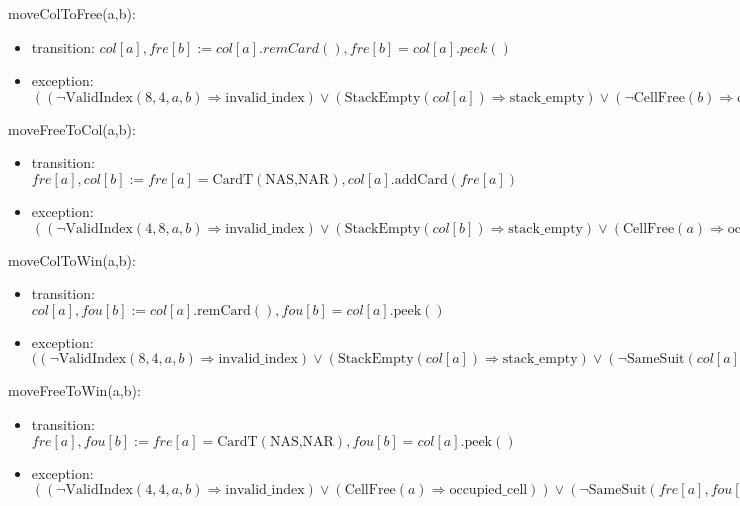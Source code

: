 \documentclass[12pt]{article}
\newcommand{\means}{\Rightarrow}
\newcommand{\m}[1]{\mbox{#1}}
\begin{document}
\noindent moveColToFree(a,b):
\begin{itemize}
    \item transition: $col[a], fre[b] := col[a].remCard(), fre[b]=col[a].peek()$
    \item exception: $((\lnot \m{ValidIndex}(8,4,a,b) \means \m{invalid\_index}) \lor (\m{StackEmpty}(col[a]) \means \m{stack\_empty}) \lor (\lnot \m{CellFree}(b) \means \m{occupied\_cell}))$
\end{itemize}

\noindent moveFreeToCol(a,b):
\begin{itemize}
    \item transition: $fre[a], col[b] := fre[a]=\mbox{CardT}(\mbox{NAS,NAR}), col[a].\m{addCard}(fre[a])$
    \item exception: $((\lnot \m{ValidIndex}(4,8,a,b) \means \m{invalid\_index}) \lor (\m{StackEmpty}(col[b]) \means \m{stack\_empty}) \lor (\m{CellFree}(a) \means \m{occupied\_cell})) \lor (\lnot \m{AlternatingColour}(fre[a],col[b].\m{peek}()) \means \m{not\_alternating\_colour}) \lor (\lnot \m{DecreasingRank}(fre[a],col[b].\m{peek}()) \means \m{not\_decreasing\_rank}))$
\end{itemize}

\noindent moveColToWin(a,b):
\begin{itemize}
    \item transition: $col[a], fou[b] := col[a].\m{remCard}(), fou[b]=col[a].\m{peek}()$
    \item exception: $((\lnot \m{ValidIndex}(8,4,a,b) \means \m{invalid\_index}) \lor (\m{StackEmpty}(col[a]) \means \m{stack\_empty}) \lor (\lnot \m{SameSuit}(col[a].\m{peek}(),fou[b]) \means \m{not\_same\_suit}) \lor (\lnot \m{IncreasingRank}(fou[b],col[a].\m{peek}()) \means \m{not\_ascending\_rank})$
\end{itemize}

\noindent moveFreeToWin(a,b):
\begin{itemize}
    \item transition: $fre[a], fou[b] := fre[a]=\mbox{CardT}(\mbox{NAS,NAR}), fou[b]=col[a].\m{peek}()$
    \item exception: $((\lnot \m{ValidIndex}(4,4,a,b) \means \m{invalid\_index}) \lor (\m{CellFree}(a) \means \m{occupied\_cell})) \lor (\lnot \m{SameSuit}(fre[a],fou[b]) \means \m{not\_same\_suit}) \lor (\lnot \m{IncreasingRank}(fou[b],fre[a] \means \m{not\_ascending\_rank})$
\end{itemize}
\end{document}
